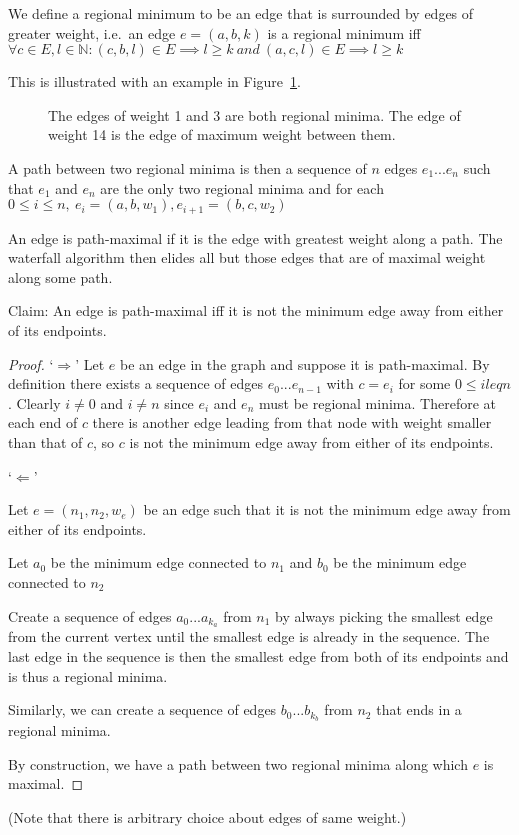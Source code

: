 \documentclass{jfp}
\begin{document}
We define a regional minimum to be an edge that is surrounded by edges
of greater weight, i.e.\ an edge $e = (a,b,k)$ is a regional
minimum iff $\forall c \in E, l \in \mathbb{N} : (c,b,l) \in E
\implies l \geq k\ and\ (a,c,l) \in E \implies l \geq k $


This is illustrated with an example in Figure~\ref{fig:regmin}.

\begin{figure}
\centering
\ifpdf
\else
\fi
\caption{The edges of weight 1 and 3 are both regional minima. The
  edge of weight 14 is the edge of maximum weight between them.}
\label{fig:regmin}
\end{figure}

A path between two regional minima is then a sequence of $n$ edges $e_1 ... e_n$
such that $e_1$ and $e_n$ are the only two regional minima
and for each $ 0 \leq i \le n,\ e_i = (a,b,w_1) , e_{i+1} = (b,c,w_2)$

\noindent An edge is path-maximal if it is the edge with greatest
weight along a path.
The waterfall algorithm then elides all but those edges that are of
maximal weight along some path.

\noindent Claim: An edge is path-maximal iff it is not the minimum
edge away from either of its endpoints.



\begin{proof}

\noindent `$\Rightarrow$'
\indent
  Let $e$ be an edge in the graph and suppose it is path-maximal.
  By definition there exists a sequence of edges $e_0 ... e_{n-1}$
  with $c = e_i$ for some $ 0 \leq i leq n$. Clearly $i \neq 0$ and $i \neq n$ since
  $e_i$ and $e_n$ must be regional minima. Therefore at each end of $c$ there is another edge
  leading from that node with weight smaller than that of $c$, so $c$ is
  not the minimum edge away from either of its endpoints.

\vspace{13pt}

\noindent
`$\Leftarrow$'
\indent

  Let $e = (n_1,n_2,w_e)$ be an edge such that it is not the minimum
  edge away from either of its endpoints.

  Let $a_0$ be the minimum edge connected to $n_1$ and $b_0$ be the
  minimum edge connected to $n_2$

  Create a sequence of edges $a_0 ... a_{k_a}$  from $n_1$ by always picking the smallest
  edge from the current vertex until the smallest edge is already in
  the sequence. The last edge in the sequence is then the smallest
  edge from both of its endpoints and is thus a regional minima.

  Similarly, we can create a sequence of edges $b_0 ... b_{k_b}$ from
  $n_2$ that ends in a regional minima.

  By construction, we have a path between two regional minima along which
  $e$ is maximal.


\end{proof}
(Note that there is arbitrary choice about edges of same weight.)
\end{document}

